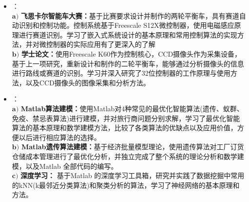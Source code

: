 \documentclass[zh]{resume}
\begin{document}
\begin{itemize}
	
	\item {}：%
	\\
	$\mathbf{a)}$ \textbf{飞思卡尔智能车大赛：}基于比赛要求设计并制作的两轮平衡车，具有赛道自动识别和控制功能。控制系统基于Freescale S12X微控制器，使用电磁感应原理进行赛道识别。学习了嵌入式系统设计的基本原理和常用控制算法的实现方法，并对微控制器的实际应用有了更深入的了解\\
	$\mathbf{b)}$ \textbf{学士论文：}使用Freescale K60作为控制核心，CCD摄像头作为采集设备，基于上一项研究，重新设计和制作的二轮平衡车，能够通过分析摄像头的信息进行路线或赛道的识别。学习并深入研究了32位控制器的工作原理与使用方法，以及CCD摄像头的图像采集和分析方法。
	
	\item 
	：%
	\\
	$ \mathbf{a)}  $ \textbf{Matlab算法建模：}使用Matlab对4种常见的最优化智能算法(遗传、蚁群、免疫、禁忌表算法)进行建模，并对旅行商问题分别求解，学习了最优化智能算法的基本原理和数学建模方法，比较了各类算法的优缺点以及应用价值，方便以后进行相应算法的选择。\\
	$ \mathbf{b)}  $ \textbf{Matlab遗传算法建模：}基于经济批量模型理论，使用遗传算法对工厂订货仓储成本管理进行了最优化分析，并独立完成了整个系统的理论分析和数学建模，以及Matlab 全部代码的编写。\\
	$ \mathbf{c)}  $ \textbf{深度学习： }基于Matlab 的深度学习工具箱，研究并实践了数据挖掘中常用的kNN(k最邻近分类算法)和聚类分析的算法，学习了神经网络的基本原理和方法。
	
	
	
	
	
  		
\end{itemize}
\end{document}
